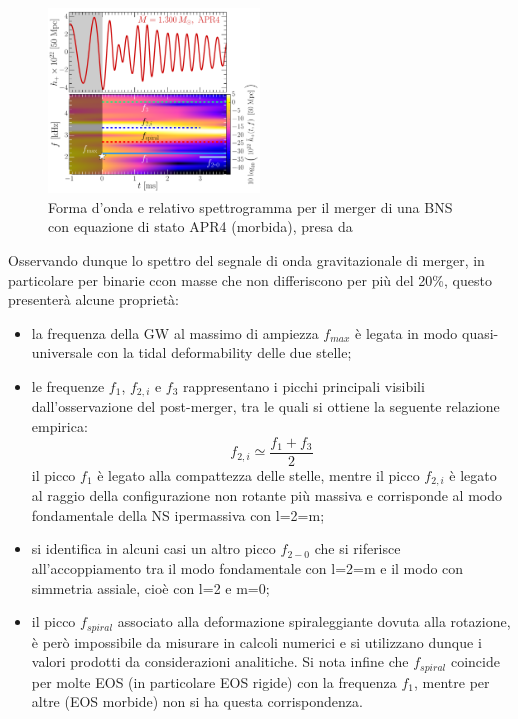 \begin{figure}
	\vspace{-15pt}
	\begin{center}
		\includegraphics[width=0.5\textwidth]{figures/Capitolo_1/GW_spectrogram_short_APR4-q10-M1300.pdf}
	\end{center}
	\vspace{-10pt}
	\caption{Forma d'onda e relativo spettrogramma per il merger di una BNS con equazione di stato APR4 (morbida), presa da \cite{Rezzolla_2016}}
	\label{fig:spettrogramma_merger_APR4}
	\vspace{-25pt}
\end{figure}

Osservando dunque lo spettro del segnale di onda gravitazionale di merger, in particolare per binarie ccon masse che non differiscono per più del 20\%, questo presenterà alcune proprietà\cite{Rezzolla_2016}:
\begin{itemize}
   	\item la frequenza della GW al massimo di ampiezza $f_{max}$ è legata in modo quasi-universale con la tidal deformability delle due stelle;
   	\item le frequenze $f_1$, $f_{2,i}$ e $f_3$ rappresentano i picchi principali visibili dall'osservazione del post-merger, tra le quali si ottiene la seguente relazione empirica:
   	\begin{equation}
   		f_{2,i}\simeq\frac{f_1 + f_3}{2} 
   		\label{eqn:f1_2_3}
   	\end{equation} 
   	il picco $f_1$ è legato alla compattezza delle stelle, mentre il picco $f_{2,i}$ è legato al raggio della configurazione non rotante più massiva e corrisponde al modo fondamentale della NS ipermassiva con l=2=m;
\end{itemize}

\begin{itemize}
   	\item si identifica in alcuni casi un altro picco $f_{2-0}$ che si riferisce all'accoppiamento tra il modo fondamentale con l=2=m e il modo con simmetria assiale, cioè con l=2 e m=0;
   	\item il picco $f_{spiral}$ associato alla deformazione spiraleggiante dovuta alla rotazione, è però impossibile da misurare in calcoli numerici e si utilizzano dunque i valori prodotti da considerazioni analitiche. Si nota infine che $f_{spiral}$ coincide per molte EOS (in particolare EOS rigide) con la frequenza $f_1$, mentre per altre (EOS morbide) non si ha questa corrispondenza.
\end{itemize}

